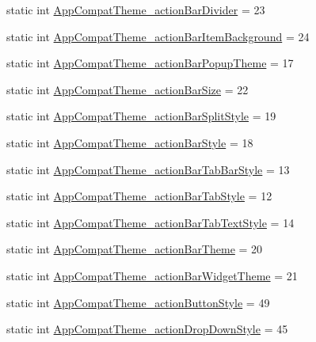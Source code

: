 \begin{DoxyCompactItemize}
\item 
static int \hyperlink{classandroid_1_1support_1_1v4_1_1R_1_1styleable_a0732bf3940b6c83753703acb180467fb}{App\+Compat\+Theme\+\_\+action\+Bar\+Divider} = 23
\item 
static int \hyperlink{classandroid_1_1support_1_1v4_1_1R_1_1styleable_a60558b418ddb9737883935cae40a928c}{App\+Compat\+Theme\+\_\+action\+Bar\+Item\+Background} = 24
\item 
static int \hyperlink{classandroid_1_1support_1_1v4_1_1R_1_1styleable_add3e5d5f9d1b972dd09d10ff0cc47d4d}{App\+Compat\+Theme\+\_\+action\+Bar\+Popup\+Theme} = 17
\item 
static int \hyperlink{classandroid_1_1support_1_1v4_1_1R_1_1styleable_aa92fde6683d052bff4e488f9f4dfdacc}{App\+Compat\+Theme\+\_\+action\+Bar\+Size} = 22
\item 
static int \hyperlink{classandroid_1_1support_1_1v4_1_1R_1_1styleable_ab3556694f1ba3adfd224a083e4c5b5b2}{App\+Compat\+Theme\+\_\+action\+Bar\+Split\+Style} = 19
\item 
static int \hyperlink{classandroid_1_1support_1_1v4_1_1R_1_1styleable_abfc7ed80904100dcd77301a5d21b8e1f}{App\+Compat\+Theme\+\_\+action\+Bar\+Style} = 18
\item 
static int \hyperlink{classandroid_1_1support_1_1v4_1_1R_1_1styleable_a53ff434fe900f2e065169c843ae14dd4}{App\+Compat\+Theme\+\_\+action\+Bar\+Tab\+Bar\+Style} = 13
\item 
static int \hyperlink{classandroid_1_1support_1_1v4_1_1R_1_1styleable_ace82d68d7bf21eba34ee1fc9395ad742}{App\+Compat\+Theme\+\_\+action\+Bar\+Tab\+Style} = 12
\item 
static int \hyperlink{classandroid_1_1support_1_1v4_1_1R_1_1styleable_af037c9c5d52f2269044bf14075a0a624}{App\+Compat\+Theme\+\_\+action\+Bar\+Tab\+Text\+Style} = 14
\item 
static int \hyperlink{classandroid_1_1support_1_1v4_1_1R_1_1styleable_a0a71bc29ce92a20e2a10e528565e55bf}{App\+Compat\+Theme\+\_\+action\+Bar\+Theme} = 20
\item 
static int \hyperlink{classandroid_1_1support_1_1v4_1_1R_1_1styleable_a0d30112c3d0cc880197dd311dbbf7def}{App\+Compat\+Theme\+\_\+action\+Bar\+Widget\+Theme} = 21
\item 
static int \hyperlink{classandroid_1_1support_1_1v4_1_1R_1_1styleable_a80982be55634192a193cf55c01a21de4}{App\+Compat\+Theme\+\_\+action\+Button\+Style} = 49
\item 
static int \hyperlink{classandroid_1_1support_1_1v4_1_1R_1_1styleable_a31fc54e0e58a5938661e66469a5a5b5f}{App\+Compat\+Theme\+\_\+action\+Drop\+Down\+Style} = 45

\end{DoxyCompactItemize}
